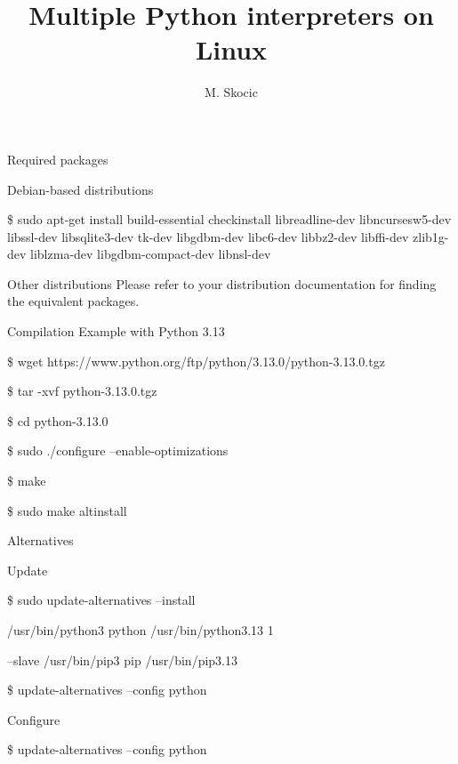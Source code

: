 \documentclass[10pt,compress]{beamer}
\title{Multiple Python interpreters on Linux}
\author{M. Skocic}
\date{}
\begin{document}
\begin{frame}
    \titlepage
\end{frame}

\begin{frame}{Required packages}
    
    \begin{alertblock}{Debian-based distributions}
        \begin{semiverbatim}
        {\small
        \$ sudo apt-get install build-essential checkinstall
        libreadline-dev libncursesw5-dev libssl-dev 
        libsqlite3-dev tk-dev libgdbm-dev libc6-dev libbz2-dev libffi-dev
        zlib1g-dev liblzma-dev libgdbm-compact-dev libnsl-dev}
        \end{semiverbatim}
    \end{alertblock}

    \begin{alertblock}{Other distributions}
        Please refer to your distribution documentation for finding the 
        equivalent packages.
    \end{alertblock}

\end{frame}


\begin{frame}{Compilation}
    \alert{Example with Python 3.13}
        \begin{semiverbatim}
            {\small

            \$ wget https://www.python.org/ftp/python/3.13.0/python-3.13.0.tgz
            
            \$ tar -xvf python-3.13.0.tgz
            
            \$ cd python-3.13.0

            \$ sudo ./configure --enable-optimizations

            \$ make

            \$ sudo make altinstall
            }
        \end{semiverbatim}
\end{frame}


\begin{frame}{Alternatives}
    \begin{alertblock}{Update}
        \begin{semiverbatim}
            {\small

            \$ sudo update-alternatives --install \ 

            /usr/bin/python3 python /usr/bin/python3.13 1 \
            
            --slave /usr/bin/pip3 pip /usr/bin/pip3.13

            \$ update-alternatives --config python
            }
        \end{semiverbatim}
    \end{alertblock}
    
    \begin{alertblock}{Configure}
        \begin{semiverbatim}
            {\small
            \$ update-alternatives --config python
            }
        \end{semiverbatim}
    \end{alertblock}
\end{frame}
\end{document}
